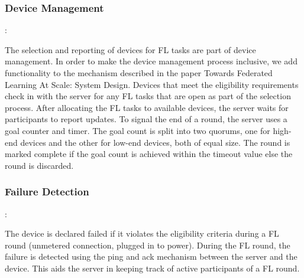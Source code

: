         \subsubsection{Device Management}:
        
            The selection and reporting of devices for FL tasks are part of device management. In order to make the device management process inclusive, we add functionality to the mechanism described in the paper Towards Federated Learning At Scale: System Design. Devices that meet the eligibility requirements check in with the server for any FL tasks that are open as part of the selection process. After allocating the FL tasks to available devices, the server waits for participants to report updates. To signal the end of a round, the server uses a goal counter and timer. The goal count is split into two quorums, one for high-end devices and the other for low-end devices, both of equal size. The round is marked complete if the goal count is achieved within the timeout value else the round is discarded.\\
        \subsubsection{Failure Detection}:

            The device is declared failed if it violates the eligibility criteria during a FL round (unmetered connection, plugged in to power). During the FL round, the failure is detected using the ping and ack mechanism between the server and the device. This aids the server in keeping track of active participants of a FL round.